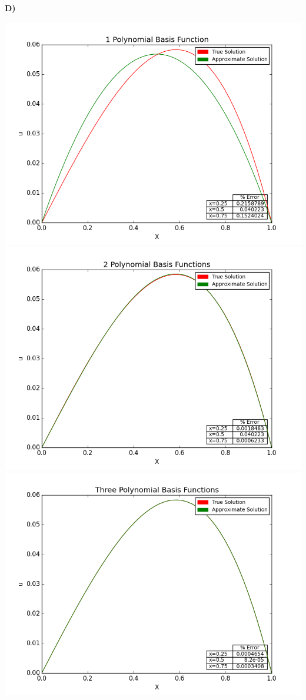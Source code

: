 \documentclass[10pt]{article}
\newcommand{\tbf}[1]{\textbf{#1}}
\begin{document}
\newpage
\tbf{D)}
\begin{center}
\includegraphics[scale=0.4]{one_poly.png}\includegraphics[scale=0.4]{two_poly.png}
\includegraphics[scale=0.4]{three_poly.png}
\end{center}
\end{document}
